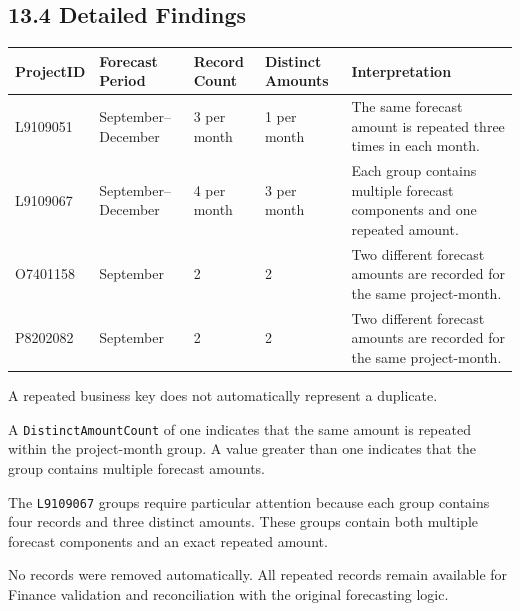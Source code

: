 \documentclass[11pt,a4paper]{article}
\begin{document}
\subsection{13.4 Detailed Findings}

\begin{tabularx}{\textwidth}{
    >{\ttfamily}p{2.6cm}
    p{2.8cm}
    p{2.2cm}
    p{2.7cm}
    X
}

\toprule

ProjectID
&
Forecast Period
&
Record Count
&
Distinct Amounts
&
Interpretation
\\

\midrule

L9109051
&
September--December
&
3 per month
&
1 per month
&
The same forecast amount is repeated three times in each month.
\\

L9109067
&
September--December
&
4 per month
&
3 per month
&
Each group contains multiple forecast components and one repeated amount.
\\

O7401158
&
September
&
2
&
2
&
Two different forecast amounts are recorded for the same project-month.
\\

P8202082
&
September
&
2
&
2
&
Two different forecast amounts are recorded for the same project-month.
\\

\bottomrule

\end{tabularx}

\begin{warningbox}

A repeated business key does not automatically represent a duplicate.

A \texttt{DistinctAmountCount} of one indicates that the same amount is
repeated within the project-month group. A value greater than one indicates
that the group contains multiple forecast amounts.

The \texttt{L9109067} groups require particular attention because each group
contains four records and three distinct amounts. These groups contain both
multiple forecast components and an exact repeated amount.

No records were removed automatically. All repeated records remain available
for Finance validation and reconciliation with the original forecasting
logic.

\end{warningbox}
\end{document}
